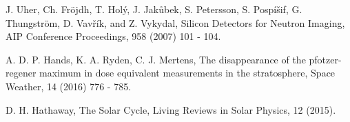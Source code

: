 \begin{thebibliography}{00}
  J. Uher, Ch. Fröjdh, T. Holý, J. Jakůbek, S. Petersson, S. Pospíšif, G. Thungström, D. Vavřík, and Z. Vykydal, Silicon Detectors for Neutron Imaging, AIP Conference Proceedings, 958 (2007) 101 - 104.

  A. D. P. Hands, K. A. Ryden, C. J. Mertens, The disappearance of the pfotzer-regener maximum in dose equivalent measurements in the stratosphere, Space Weather, 14 (2016) 776 - 785.
  
  D. H. Hathaway, The Solar Cycle, Living Reviews in Solar Physics, 12 (2015).

\end{thebibliography}
%
%
%
%
%
%
%
%
%
%
%
%
